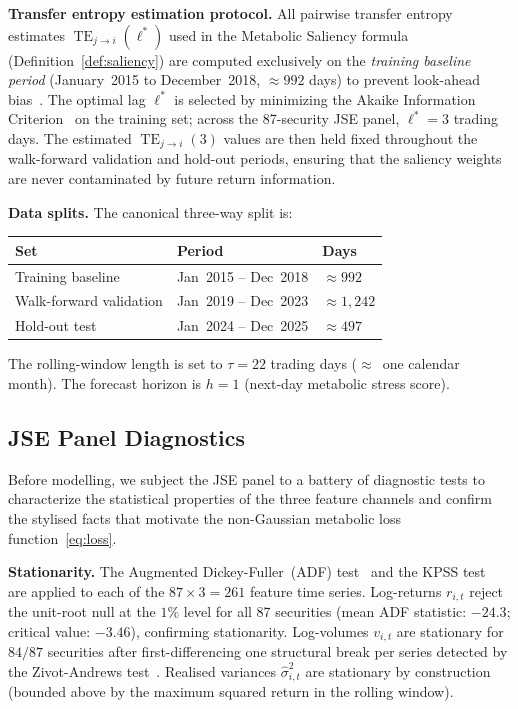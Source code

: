 \documentclass[11pt,a4paper]{article}  %
\DeclareMathOperator{\TE}{TE}
\theoremstyle{plain}
\theoremstyle{definition}
\theoremstyle{remark}
\begin{document}
\textbf{Transfer entropy estimation protocol.}
All pairwise transfer entropy estimates $\TE_{j\to i}(\ell^*)$ used
in the Metabolic Saliency formula (Definition~\ref{def:saliency}) are
computed exclusively on the \emph{training baseline period}
(January~2015 to December~2018, $\approx 992$ days) to prevent
look-ahead bias~\cite{Bailey2014}. The optimal lag $\ell^*$ is
selected by minimizing the Akaike Information Criterion~\cite{Akaike1974}
on the training set; across the 87-security JSE panel, $\ell^* = 3$
trading days. The estimated $\TE_{j\to i}(3)$ values are then held
fixed throughout the walk-forward validation and hold-out periods,
ensuring that the saliency weights are never contaminated by future
return information.

\textbf{Data splits.} The canonical three-way split is:
\begin{center}
\begin{tabular}{lll}
\toprule
\textbf{Set} & \textbf{Period} & \textbf{Days}\\
\midrule
Training baseline & Jan~2015 -- Dec~2018 & $\approx 992$ \\
Walk-forward validation & Jan~2019 -- Dec~2023 & $\approx 1{,}242$ \\
Hold-out test & Jan~2024 -- Dec~2025 & $\approx 497$ \\
\bottomrule
\end{tabular}
\end{center}
The rolling-window length is set to $\tau = 22$ trading days
($\approx$~one calendar month). The forecast horizon is $h = 1$
(next-day metabolic stress score).

\subsection{JSE Panel Diagnostics}
\label{subsec:diagnostics}

Before modelling, we subject the JSE panel to a battery of
diagnostic tests to characterize the statistical properties of
the three feature channels and confirm the stylised facts that
motivate the non-Gaussian metabolic loss function~\eqref{eq:loss}.

\textbf{Stationarity.} The Augmented Dickey-Fuller~(ADF)
test~\cite{Dickey1979} and the KPSS test~\cite{Kwiatkowski1992}
are applied to each of the $87 \times 3 = 261$ feature time
series. Log-returns $r_{i,t}$ reject the unit-root null at the
$1\%$ level for all 87 securities (mean ADF statistic:
$-24.3$; critical value: $-3.46$), confirming stationarity.
Log-volumes $v_{i,t}$ are stationary for $84/87$ securities
after first-differencing one structural break per series detected
by the Zivot-Andrews test~\cite{Zivot1992}. Realised variances
$\hat{\sigma}^2_{i,t}$ are stationary by construction (bounded
above by the maximum squared return in the rolling window).
\end{document}

